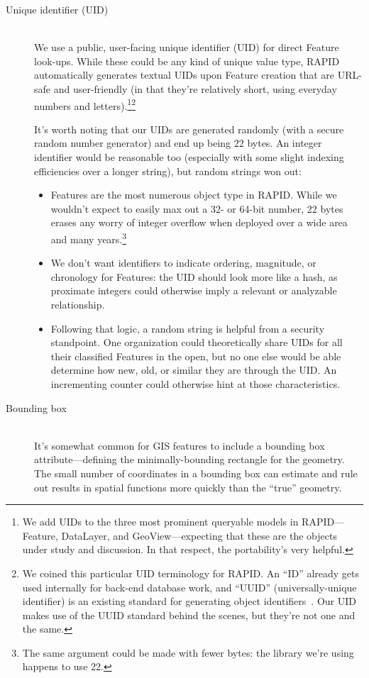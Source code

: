\begin{description}
  \item[Unique identifier (UID)] \hfill \\
  We use a public, user-facing unique identifier (UID) for direct Feature look-ups. While these could be any kind of unique value type, RAPID automatically generates textual UIDs upon Feature creation that are URL-safe and user-friendly (in that they're relatively short, using everyday numbers and letters).\footnote{We add UIDs to the three most prominent queryable models in RAPID---Feature, DataLayer, and GeoView---expecting that these are the objects under study and discussion. In that respect, the portability's very helpful.}\footnote{We coined this particular UID terminology for RAPID. An ``ID'' already gets used internally for back-end database work, and ``UUID'' (universally-unique identifier) is an existing standard for generating object identifiers~\cite{Leach}. Our UID makes use of the UUID standard behind the scenes, but they're not one and the same.}
  
It's worth noting that our UIDs are generated randomly (with a secure random number generator) and end up being 22 bytes. An integer identifier would be reasonable too (especially with some slight indexing efficiencies over a longer string), but random strings won out:
  
  \begin{itemize}
  \item Features are the most numerous object type in RAPID. While we wouldn't expect to easily max out a 32- or 64-bit number, 22 bytes erases any worry of integer overflow when deployed over a wide area and many years.\footnote{The same argument could be made with fewer bytes: the library we're using happens to use 22.}
  \item We don't want identifiers to indicate ordering, magnitude, or chronology for Features: the UID should look more like a hash, as proximate integers could otherwise imply a relevant or analyzable relationship.
  \item Following that logic, a random string is helpful from a security standpoint. One organization could theoretically share UIDs for all their classified Features in the open, but no one else would be able determine how new, old, or similar they are through the UID. An incrementing counter could otherwise hint at those characteristics.
\end{itemize}
  
\item[Bounding box] \hfill \\
  It's somewhat common for GIS features to include a bounding box attribute---defining the minimally-bounding rectangle for the geometry. The small number of coordinates in a bounding box can estimate and rule out results in spatial functions more quickly than the ``true'' geometry.


\end{description}
